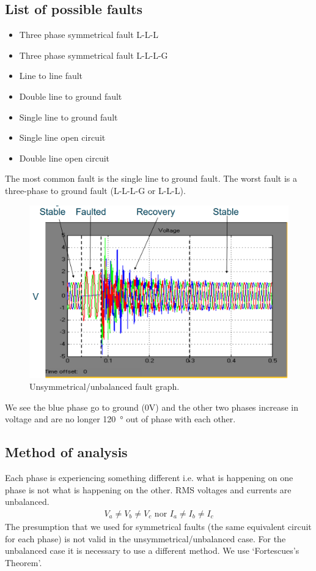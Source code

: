 \subsection{List of possible faults}
\begin{itemize}
	\item Three phase symmetrical fault L-L-L
	\item Three phase symmetrical fault L-L-L-G
	\item Line to line fault
	\item Double line to ground fault
	\item Single line to ground fault
	\item Single line open circuit
	\item Double line open circuit
\end{itemize}
The most common fault is the single line to ground fault. The worst fault is a three-phase to ground fault (L-L-L-G or L-L-L).
\begin{figure}[H]
	\centering
	\includegraphics[width = \textwidth]{./img/figure21.png}
	\caption{Unsymmetrical/unbalanced fault graph.}
\end{figure}
We see the blue phase go to ground (0V) and the other two phases increase in voltage and are no longer \SI{120}{\degree} out of phase with each other.
\subsection{Method of analysis}
Each phase is experiencing something different i.e. what is happening on one phase is not what is happening on the other. RMS voltages and currents are unbalanced.
\begin{gather}
	V_a \neq V_b \neq V_c \textrm{ nor } I_a \neq I_b \neq I_c
\end{gather}
The presumption that we used for symmetrical faults (the same equivalent circuit for each phase) is not valid in the unsymmetrical/unbalanced case. For the unbalanced case it is necessary to use a different method. We use `Fortescues's Theorem'.
